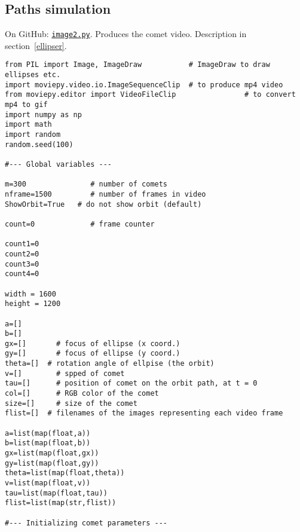 \documentclass[oneside,10pt]{book}
\begin{document}
\subsection{Paths simulation}

On GitHub: \href{https://github.com/VincentGranville/Visualizations/blob/main/Source-Code/image2.py}{\texttt{image2.py}}. Produces the comet video. Description in section~\ref{ellipser}.

\begin{lstlisting}
from PIL import Image, ImageDraw           # ImageDraw to draw ellipses etc.
import moviepy.video.io.ImageSequenceClip  # to produce mp4 video
from moviepy.editor import VideoFileClip                # to convert mp4 to gif
import numpy as np
import math
import random
random.seed(100)

#--- Global variables ---

m=300               # number of comets
nframe=1500         # number of frames in video
ShowOrbit=True   # do not show orbit (default)

count=0             # frame counter

count1=0
count2=0
count3=0
count4=0

width = 1600
height = 1200

a=[]
b=[]
gx=[]       # focus of ellipse (x coord.)
gy=[]       # focus of ellipse (y coord.)
theta=[]  # rotation angle of ellpise (the orbit)
v=[]        # spped of comet
tau=[]      # position of comet on the orbit path, at t = 0
col=[]      # RGB color of the comet
size=[]     # size of the comet
flist=[]  # filenames of the images representing each video frame

a=list(map(float,a))
b=list(map(float,b))
gx=list(map(float,gx))
gy=list(map(float,gy))
theta=list(map(float,theta))
v=list(map(float,v))
tau=list(map(float,tau))
flist=list(map(str,flist))

#--- Initializing comet parameters ---


\end{lstlisting}
\end{document}
